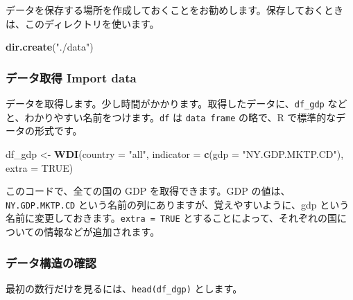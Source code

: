 \documentclass[
  xelatex, ja=standard]{bxjsbook}
\newenvironment{Shaded}{\begin{snugshade}}{\end{snugshade}}
\newcommand{\AttributeTok}[1]{\textcolor[rgb]{0.13,0.29,0.53}{#1}}
\newcommand{\ConstantTok}[1]{\textcolor[rgb]{0.56,0.35,0.01}{#1}}
\newcommand{\FunctionTok}[1]{\textcolor[rgb]{0.13,0.29,0.53}{\textbf{#1}}}
\newcommand{\NormalTok}[1]{#1}
\newcommand{\OtherTok}[1]{\textcolor[rgb]{0.56,0.35,0.01}{#1}}
\newcommand{\StringTok}[1]{\textcolor[rgb]{0.31,0.60,0.02}{#1}}
\theoremstyle{definition}
\theoremstyle{definition}
\theoremstyle{definition}
\theoremstyle{definition}
\theoremstyle{remark}
\begin{document}
データを保存する場所を作成しておくことをお勧めします。保存しておくときは、このディレクトリを使います。

\begin{Shaded}
\begin{Highlighting}[]
\FunctionTok{dir.create}\NormalTok{(}\StringTok{"./data"}\NormalTok{)}
\end{Highlighting}
\end{Shaded}

\hypertarget{ux30c7ux30fcux30bfux53d6ux5f97-import-data-1}{%
\subsubsection{データ取得 Import data}\label{ux30c7ux30fcux30bfux53d6ux5f97-import-data-1}}

データを取得します。少し時間がかかります。取得したデータに、\texttt{df\_gdp} などと、わかりやすい名前をつけます。\texttt{df} は \texttt{data\ frame} の略で、R で標準的なデータの形式です。

\begin{Shaded}
\begin{Highlighting}[]
\NormalTok{df\_gdp }\OtherTok{\textless{}{-}} \FunctionTok{WDI}\NormalTok{(}\AttributeTok{country =} \StringTok{"all"}\NormalTok{, }
              \AttributeTok{indicator =} \FunctionTok{c}\NormalTok{(}\AttributeTok{gdp =} \StringTok{"NY.GDP.MKTP.CD"}\NormalTok{), }
              \AttributeTok{extra =} \ConstantTok{TRUE}\NormalTok{)}
\end{Highlighting}
\end{Shaded}

このコードで、全ての国の GDP を取得できます。GDP の値は、\texttt{NY.GDP.MKTP.CD} という名前の列にありますが、覚えやすいように、gdp という名前に変更しておきます。\texttt{extra\ =\ TRUE} とすることによって、それぞれの国についての情報などが追加されます。

\hypertarget{ux30c7ux30fcux30bfux69cbux9020ux306eux78baux8a8d-1}{%
\subsubsection{データ構造の確認}\label{ux30c7ux30fcux30bfux69cbux9020ux306eux78baux8a8d-1}}

最初の数行だけを見るには、\texttt{head(df\_dgp)} とします。
\end{document}
